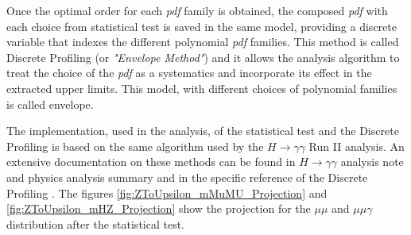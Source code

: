 Once the optimal order for each \textit{pdf} family is obtained, the composed \textit{pdf} with each choice from statistical test is saved in the same model, providing a discrete variable that indexes the different polynomial \textit{pdf} families. This method is called Discrete Profiling (or \textit{"Envelope Method"}) and it allows the analysis algorithm to treat the choice of the \textit{pdf} as a systematics and incorporate its effect in the extracted upper limits. This model, with different choices of polynomial families is called envelope.

The implementation, used in the analysis, of the statistical test and the Discrete Profiling is based on the same algorithm used by the $H \rightarrow \gamma\gamma$ Run II analysis. An extensive documentation on these methods can be found in $H \rightarrow \gamma\gamma$ analysis note and physics analysis summary \cite{higgs_gammagamma_AN, higgs_gammagamma_PAS} and in the specific reference of the Discrete Profiling \cite{DiscreteProfilingMethod}. The figures \ref{fig:ZToUpsilon_mMuMU_Projection} and \ref{fig:ZToUpsilon_mHZ_Projection} show the projection for the $\mu\mu$ and $\mu\mu\gamma$ distribution after the statistical test.

